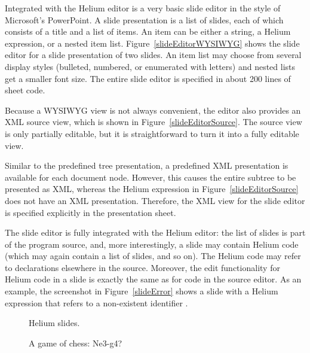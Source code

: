 Integrated with the Helium editor is a very basic slide editor in the style of Microsoft's PowerPoint. A slide presentation is a list of slides, each of which consists of a title and a list of items. An item can be either a string, a Helium expression, or a nested item list. Figure~\ref{slideEditorWYSIWYG} shows the slide editor for a slide presentation of two slides. An item list may choose from several display styles (bulleted, numbered, or enumerated with letters) and nested lists get a smaller font size. The entire slide editor is specified in about 200 lines of sheet code.

Because a WYSIWYG view is not always convenient, the editor also provides an XML source view, which is shown in Figure~\ref{slideEditorSource}. The source view is only partially editable, but it is straightforward to turn it into a fully editable view. 

\bc Similar to the predefined tree presentation, a predefined XML presentation is available for each document node. However, this causes the entire subtree to be presented as XML, whereas the Helium expression in Figure~\ref{slideEditorSource} does not have an XML presentation. Therefore, the XML view for the slide editor is  specified explicitly in the presentation sheet. \ec



The slide editor is fully integrated with the Helium editor: the list of slides is part of the program source, and, more interestingly, a slide may contain Helium code (which may again contain a list of slides, and so on). The Helium code may refer to declarations elsewhere in the source. Moreover, the edit functionality for Helium code in a slide is exactly the same as for code in the source editor. As an example, the screenshot in Figure~\ref{slideError} shows a slide with  a Helium expression that refers to a non-existent identifier .

\begin{figure}
\begin{minipage}[t]{.47\textwidth}
    \begin{center}   
      \caption{Helium slides.} \label{slideError}
    \end{center}
  \end{minipage}
\hfill
\begin{minipage}[t]{.47\textwidth}
    \begin{center}  
      \caption{A game of chess: Ne3-g4?}\label{chessBoard} 
    \end{center}
  \end{minipage}
\end{figure}



